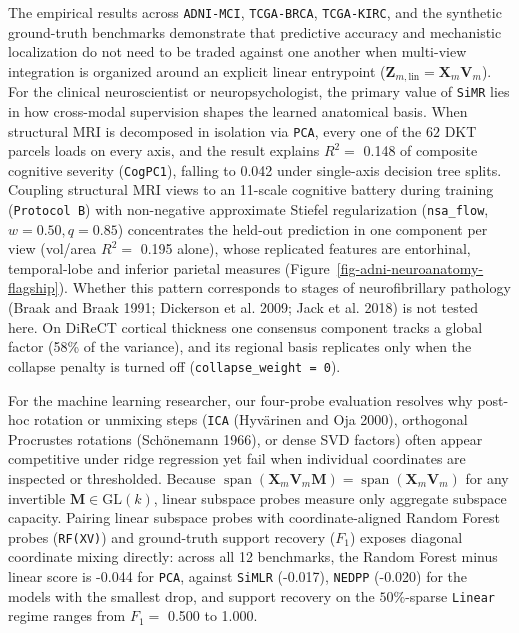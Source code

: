\documentclass[
  10pt,
  letterpaper,
]{report}
\begin{document}
The empirical results across \texttt{ADNI-MCI}, \texttt{TCGA-BRCA},
\texttt{TCGA-KIRC}, and the synthetic ground-truth benchmarks
demonstrate that predictive accuracy and mechanistic localization do not
need to be traded against one another when multi-view integration is
organized around an explicit linear entrypoint
(\(\mathbf{Z}_{m,\text{lin}} = \mathbf{X}_m \mathbf{V}_m\)). For the
clinical neuroscientist or neuropsychologist, the primary value of
\texttt{SiMR} lies in how cross-modal supervision shapes the learned
anatomical basis. When structural MRI is decomposed in isolation via
\texttt{PCA}, every one of the \(62\) DKT parcels loads on every axis,
and the result explains \(R^2 =\) 0.148 of composite cognitive severity
(\texttt{CogPC1}), falling to 0.042 under single-axis decision tree
splits. Coupling structural MRI views to an 11-scale cognitive battery
during training (\texttt{Protocol\ B}) with non-negative approximate
Stiefel regularization (\texttt{nsa\_flow}, \(w = 0.50, q = 0.85\))
concentrates the held-out prediction in one component per view (vol/area
\(R^2 =\) 0.195 alone), whose replicated features are entorhinal,
temporal-lobe and inferior parietal measures
(Figure~\ref{fig-adni-neuroanatomy-flagship}). Whether this pattern
corresponds to stages of neurofibrillary pathology (Braak and Braak
1991; {Dickerson et al.} 2009; {Jack et al.} 2018) is not tested here.
On DiReCT cortical thickness one consensus component tracks a global
factor (58\% of the variance), and its regional basis replicates only
when the collapse penalty is turned off
(\texttt{collapse\_weight\ =\ 0}).

For the machine learning researcher, our four-probe evaluation resolves
why post-hoc rotation or unmixing steps (\texttt{ICA} (Hyvärinen and Oja
2000), orthogonal Procrustes rotations (Schönemann 1966), or dense SVD
factors) often appear competitive under ridge regression yet fail when
individual coordinates are inspected or thresholded. Because
\(\operatorname{span}(\mathbf{X}_m \mathbf{V}_m \mathbf{M}) = \operatorname{span}(\mathbf{X}_m \mathbf{V}_m)\)
for any invertible \(\mathbf{M} \in \mathrm{GL}(k)\), linear subspace
probes measure only aggregate subspace capacity. Pairing linear subspace
probes with coordinate-aligned Random Forest probes (\texttt{RF(XV)})
and ground-truth support recovery (\(F_1\)) exposes diagonal coordinate
mixing directly: across all 12 benchmarks, the Random Forest minus
linear score is -0.044 for \texttt{PCA}, against \texttt{SiMLR}
(-0.017), \texttt{NEDPP} (-0.020) for the models with the smallest drop,
and support recovery on the \(50\%\)-sparse \texttt{Linear} regime
ranges from \(F_1 =\) 0.500 to 1.000.
\end{document}
